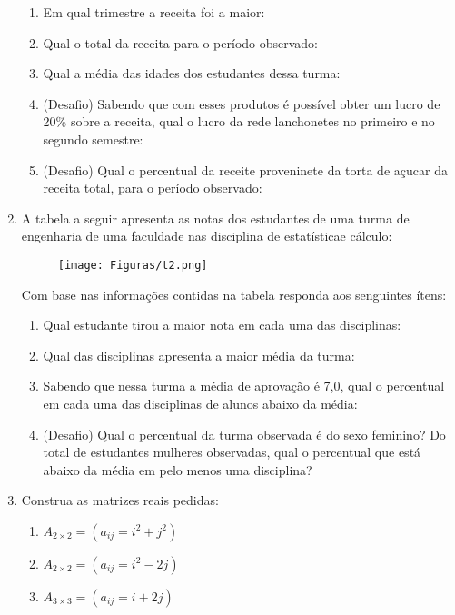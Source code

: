 \documentclass[oneside,a4paper,10pt]{article}
\begin{document}
\begin{enumerate}
	\begin{enumerate}
	\item Em qual trimestre a receita foi a maior:
	\item Qual o total da receita para o período observado:
	\item Qual a média das idades dos estudantes dessa turma:
	\item (Desafio) Sabendo que com esses produtos é possível obter um lucro de 20\% sobre a receita, qual o lucro da rede lanchonetes no primeiro e no segundo semestre:
	\item (Desafio) Qual o percentual da receite proveninete da torta de açucar da receita total, para o período observado:
	\end{enumerate}
	
\item A tabela a seguir apresenta as notas dos estudantes de uma turma de engenharia de uma faculdade nas disciplina de estatísticae cálculo:

\begin{figure}[h]
\center
\texttt{[image: Figuras/t2.png]}
\label{omeubrowser}
\end{figure}

Com base nas informações contidas na tabela responda aos senguintes ítens:
	\begin{enumerate}
        \item Qual estudante tirou a maior nota em cada uma das disciplinas:
		\item Qual das disciplinas apresenta a maior média da turma:
		\item Sabendo que nessa turma a média de aprovação é 7,0, qual o percentual em cada uma das disciplinas de alunos abaixo da média:
		\item (Desafio) Qual o percentual da turma observada é do sexo feminino? Do total de estudantes mulheres observadas, qual o percentual que está abaixo da média em pelo menos uma disciplina?
	\end{enumerate}	

\item Construa as matrizes reais pedidas:
	\begin{enumerate}
        \item $A_{2\times2} = (a_{ij} = i^2 +j^2)$
		\item $A_{2\times2} = (a_{ij} = i^2 - 2j)$
		\item $A_{3\times3} = (a_{ij} = i+2j)$
	\end{enumerate}		


\end{enumerate}
\end{document}
